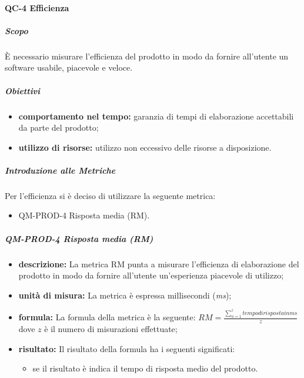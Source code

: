 		\paragraph{QC-4 Efficienza}
			\subparagraph{Scopo}
				È necessario misurare l'efficienza del prodotto in modo da fornire all'utente un software usabile, piacevole e veloce.
			\subparagraph{Obiettivi}
				\begin{itemize}
					\item \textbf{comportamento nel tempo:} garanzia di tempi di elaborazione accettabili da parte del prodotto;
					\item \textbf{utilizzo di risorse:} utilizzo non eccessivo delle risorse a disposizione.
				\end{itemize}
			\subparagraph{Introduzione alle Metriche}
				Per l'efficienza si è deciso di utilizzare la seguente metrica:
				\begin{itemize}
					\item QM-PROD-4 Risposta media (RM).
				\end{itemize}
			\subparagraph{QM-PROD-4 Risposta media (RM)}
			\begin{itemize}
      			\item \textbf{descrizione: }
					La metrica RM punta a misurare l'efficienza di elaborazione del prodotto in modo da fornire all'utente un'esperienza piacevole di utilizzo;
				\item \textbf{unità di misura: }
					La metrica è espressa millisecondi (\textit{ms});
				\item \textbf{formula: }
					La formula della metrica è la seguente:
					\(
						RM = \frac{\sum_{n=1}^{z} tempo di risposta in ms}{z}
					\)
					dove $z$ è il numero di misurazioni effettuate;
				\item \textbf{risultato: }
					Il risultato della formula ha i seguenti significati:
					\begin{itemize}
						\item se il risultato è indica il tempo di risposta medio del prodotto.
					\end{itemize}
			\end{itemize}
